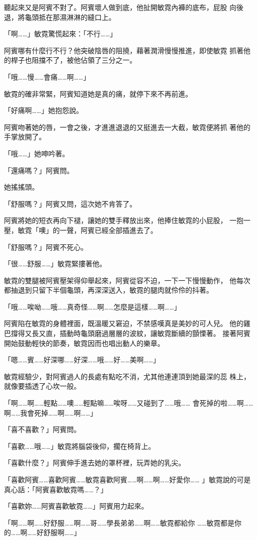 聽起來又是阿賓不對了。阿賓壞人做到底，他扯開敏霓內褲的底布，屁股
向後退，將龜頭抵在那濕淋淋的縫口上。

「啊……」敏霓驚慌起來：「不行……」

阿賓哪有什麼行不行？他突破陰唇的阻撓，藉著潤滑慢慢推進，即使敏霓
抓著他的桿子也阻擋不了，被他佔領了三分之一。

「哦……慢……會痛……啊……」

敏霓的確非常緊，阿賓知道她是真的痛，就停下來不再前進。

「好痛啊……」她抱怨說。

阿賓吻著她的唇，一會之後，才進進退退的又挺進去一大截，敏霓便將抓
著他的手掌放開了。

「哦……」她呻吟著。

「還痛嗎？」阿賓問。

她搖搖頭。

「舒服嗎？」阿賓又問，這次她不肯答了。

阿賓將她的短衣再向下褪，讓她的雙手釋放出來，他捧住敏霓的小屁股，
一抱一壓，敏霓「噢」的一聲，阿賓已經全部插進去了。

「舒服嗎？」阿賓不死心。

「很……舒服……」敏霓緊摟著他。

敏霓的雙腿被阿賓壓架得仰舉起來，阿賓從容不迫，一下一下慢慢動作，
他每次都抽退到只留下半個龜頭，再深深送入，敏霓的腿肉就伶伶的抖著。

「哦……唉呦……哦……真奇怪……啊……怎麼是這樣……啊……」

阿賓陷在敏霓的身體裡面，既溫暖又窘迫，不禁感嘆真是美妙的可人兒。
他的雞巴撐得又長又直，插動時龜頭磨過層層的波紋，讓敏霓斷續的顫慄著。
接著阿賓開始鼓動輕快的節奏，敏霓因而也唱出動人的樂章。

「嗯……賓……好深哪……好深……哦……好……美啊……」

敏霓經驗少，對阿賓過人的長處有點吃不消，尤其他連連頂到她最深的蕊
株上，就像要插透了心坎一般。

「啊……啊……輕點……噢……輕點嘛……唉呀……又碰到了……哦……
會死掉的啦……啊……啊……我會死掉……啊……啊……」

「喜不喜歡？」阿賓問。

「喜歡……哦……」敏霓將腦袋後仰，擱在椅背上。

「喜歡什麼？」阿賓伸手進去她的罩杯裡，玩弄她的乳尖。

「喜歡阿賓……喜歡阿賓……敏霓喜歡阿賓……啊……啊……好愛你……
」敏霓說的可是真心話：「阿賓喜歡敏霓嗎……？」

「喜歡妳……阿賓喜歡敏霓……」阿賓用力起來。

「啊……啊……好舒服……啊……哥……學長弟弟……啊……敏霓都給你
……敏霓都是你的……啊……好舒服啊……」

